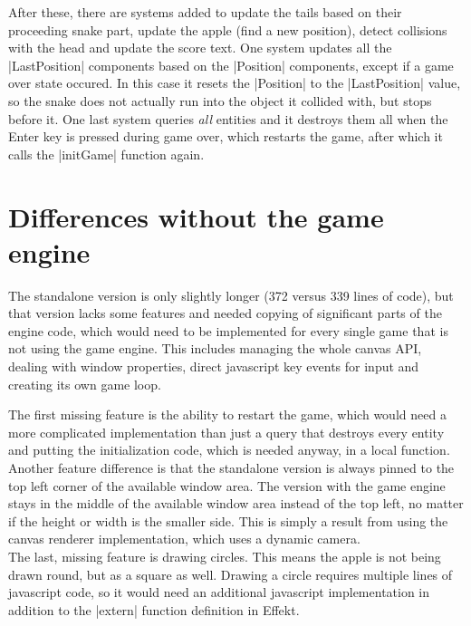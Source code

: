 After these, there are systems added to update the tails based on their proceeding snake part, update the apple (find a new position), detect collisions with the head and update the score text. One system updates all the |LastPosition| components based on the |Position| components, except if a game over state occured. In this case it resets the |Position| to the |LastPosition| value, so the snake does not actually run into the object it collided with, but stops before it. One last system queries \textit{all} entities and it destroys them all when the Enter key is pressed during game over, which restarts the game, after which it calls the |initGame| function again.

\section{Differences without the game engine}

The standalone version is only slightly longer (372 versus 339 lines of code), but that version lacks some features and needed copying of significant parts of the engine code, which would need to be implemented for every single game that is not using the game engine. This includes managing the whole canvas API, dealing with window properties, direct javascript key events for input and creating its own game loop.

The first missing feature is the ability to restart the game, which would need a more complicated implementation than just a query that destroys every entity and putting the initialization code, which is needed anyway, in a local function.\\
Another feature difference is that the standalone version is always pinned to the top left corner of the available window area. The version with the game engine stays in the middle of the available window area instead of the top left, no matter if the height or width is the smaller side. This is simply a result from using the canvas renderer implementation, which uses a dynamic camera.\\
The last, missing feature is drawing circles. This means the apple is not being drawn round, but as a square as well. Drawing a circle requires multiple lines of javascript code, so it would need an additional javascript implementation in addition to the |extern| function definition in Effekt.

